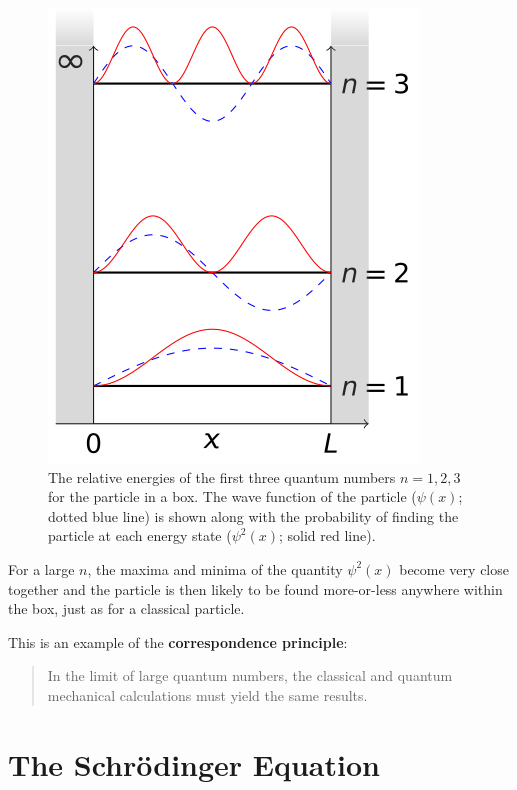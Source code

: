 \documentclass[
]{book}
\begin{document}
\begin{figure}

{\centering \includegraphics[width=0.7\linewidth]{visualisations/LaTeX/ch18-particleinbox123} 

}

\caption{The relative energies of the first three quantum numbers $n = 1, 2, 3$ for the particle in a box. The wave function of the particle ($\psi(x)$; dotted blue line) is shown along with the probability of finding the particle at each energy state ($\psi^2(x)$; solid red line). }\label{fig:ch17-partbox1}
\end{figure}

For a large \(n\), the maxima and minima of the quantity \(\psi^2(x)\) become very close together and the particle is then likely to be found more-or-less anywhere within the box, just as for a classical particle.

This is an example of the \textbf{correspondence principle}:

\begin{quote}
In the limit of large quantum numbers, the classical and quantum mechanical calculations must yield the same results.
\end{quote}

\hypertarget{sec-ch18-schrodinger}{%
\chapter{The Schrödinger Equation}\label{sec-ch18-schrodinger}}
\end{document}
